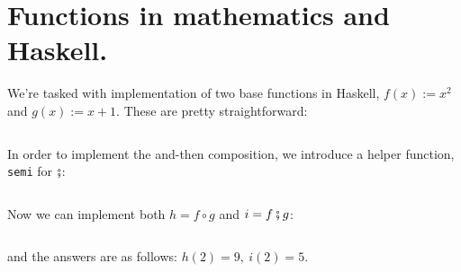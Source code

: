 \section{ Functions in mathematics and Haskell. } 
We're tasked with implementation of two base functions in Haskell, $f(x) := x^2$ and $g(x) := x + 1.$
These are pretty straightforward:
\inputminted[firstline=7,
             lastline=11,
             fontsize=\footnotesize, tabsize=4]{haskell}{ps1.hs}
In order to implement the and-then composition, we introduce a helper function, {\tt semi} for $\fatsemi$:
\inputminted[firstline=13,
             lastline=14,
             fontsize=\footnotesize, tabsize=4]{haskell}{ps1.hs}
Now we can implement both $h = f \circ g$ and $i = f \fatsemi g$:
\inputminted[firstline=16,
             lastline=20,
             fontsize=\footnotesize, tabsize=4]{haskell}{ps1.hs}
and the answers are as follows: $h(2) = 9,\ i(2) = 5.$